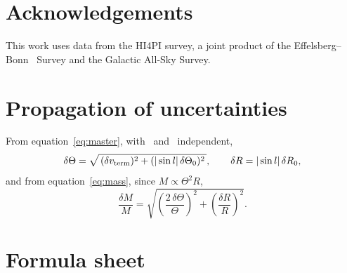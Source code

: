 \documentclass[11pt,a4paper]{article}
\begin{document}
\section*{Acknowledgements}

This work uses data from the HI4PI survey, a joint product of the
Effelsberg--Bonn \HI\ Survey and the Galactic All-Sky Survey.




\appendix
\section{Propagation of uncertainties}
\label{app:errors}

From equation~\eqref{eq:master}, with \vterm\ and \Tzero\ independent,
%
\begin{equation}
\delta\Theta = \sqrt{\,(\delta v_{\mathrm{term}})^{2} + (|\sin l|\,\delta\Theta_{0})^{2}\,},
\qquad
\delta R = |\sin l|\,\delta R_{0} ,
\label{eq:dtheta}
\end{equation}
%
and from equation~\eqref{eq:mass}, since $M \propto \Theta^{2}R$,
%
\begin{equation}
\frac{\delta M}{M}
= \sqrt{\left(\frac{2\,\delta\Theta}{\Theta}\right)^{2}
      + \left(\frac{\delta R}{R}\right)^{2}} .
\label{eq:dm}
\end{equation}
%

\section{Formula sheet}
\label{app:formulae}
\end{document}

